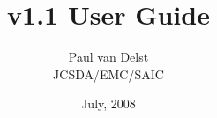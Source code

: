 



\newcommand{\Atmosphere}{\texttt{Atmosphere}}
\newcommand{\Cloud}{\texttt{Cloud}}
\newcommand{\Aerosol}{\texttt{Aerosol}}
\newcommand{\Surface}{\texttt{Surface}}
\newcommand{\GeometryInfo}{\texttt{GeometryInfo}}
\newcommand{\ChannelInfo}{\texttt{ChannelInfo}}
\newcommand{\Options}{\texttt{Options}}
\newcommand{\AtmOptics}{\texttt{AtmOptics}}
\newcommand{\SfcOptics}{\texttt{SfcOptics}}
\newcommand{\RTSolution}{\texttt{RTSolution}}
\newcommand{\AtmAbsorption}{\texttt{AtmAbsorption}}
\newcommand{\AtmScatter}{\texttt{AtmScatter}}
\newcommand{\CloudScatter}{\texttt{CloudScatter}}
\newcommand{\AerosolScatter}{\texttt{AerosolScatter}}
\newcommand{\f}[1]{\texttt{#1}}
\newcommand{\dstar}{\ensuremath{\delta^{*}\!}}
\newcommand{\rb}[1]{\raisebox{1.5ex}[0pt]{#1}}

\let\oldenumerate=\enumerate
\let\endoldenumerate=\endenumerate
\renewenvironment{enumerate}{%
  \begin{oldenumerate}%
    \setlength{\itemsep}{0ex}%
  }%
  {%
  \end{oldenumerate}%
  }


\title{v1.1 User Guide}
\author{Paul van Delst\\JCSDA/EMC/SAIC}
\date{July, 2008}



\maketitle

\draftwatermark

\setcounter{page}{1}
  \tableofcontents\newpage
  \listoffigures\newpage
  \listoftables\newpage
{}
\setcounter{page}{1}









\begin{appendix}
  
  
\end{appendix}



